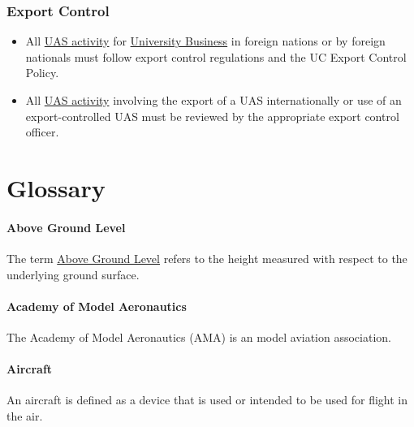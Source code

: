 \documentclass[
]{book}
\providecommand{\tightlist}{%
  \setlength{\itemsep}{0pt}\setlength{\parskip}{0pt}}
\begin{document}
\hypertarget{export-control}{%
\subsection{Export Control}\label{export-control}}

\begin{itemize}
\tightlist
\item
  All \protect\hyperlink{UASactivity}{UAS activity} for \protect\hyperlink{UB}{University Business} in foreign nations or by foreign nationals must follow export control regulations and the UC Export Control Policy.
\item
  All \protect\hyperlink{UASactivity}{UAS activity} involving the export of a UAS internationally or use of an export-controlled UAS must be reviewed by the appropriate export control officer.
\end{itemize}

\hypertarget{glossary}{%
\chapter{Glossary}\label{glossary}}

\hypertarget{AGL}{%
\subsubsection*{Above Ground Level}\label{AGL}}

The term \protect\hyperlink{AGL}{Above Ground Level} refers to the height measured with respect to the underlying ground surface.





\hypertarget{AMA}{%
\subsubsection*{Academy of Model Aeronautics}\label{AMA}}

The Academy of Model Aeronautics (AMA) is an model aviation association.

\hypertarget{aircraft}{%
\subsubsection*{Aircraft}\label{aircraft}}

An aircraft is defined as a device that is used or intended to be used for flight in the air.
\end{document}
